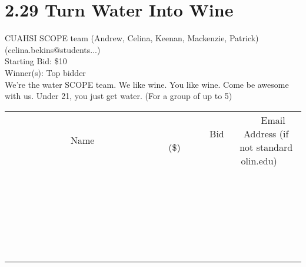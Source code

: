 \documentclass[11pt]{article}
\begin{document}
\section*{2.29 Turn Water Into Wine}
CUAHSI SCOPE team (Andrew, Celina, Keenan, Mackenzie, Patrick) (celina.bekins@students...) \\
Starting Bid: \$10 \\
Winner(s): 
Top bidder \\
We're the water SCOPE team. We like wine. You like wine. Come be awesome with us. Under 21, you just get water. (For a group of up to 5) \\[6ex]
\begin{tabular}{c c c}
~~~~~~~~~~~~~Name~~~~~~~~~~~~~ & ~~~~~~~~~Bid (\$)~~~~~~~~~ & ~~~Email Address (if not standard olin.edu)~~~ \\
 & & \\
\hline
 & & \\
\hline
 & & \\
\hline
 & & \\
\hline
 & & \\
\hline
 & & \\
\hline
 & & \\
\hline
 & & \\
\hline
 & & \\
\hline
 & & \\
\hline
 & & \\
\hline
 & & \\
\hline
 & & \\
\hline
 & & \\
\hline
 & & \\
\hline
 & & \\
\hline
 & & \\
\hline
 & & \\
\hline
 & & \\
\hline
 & & \\
\hline
 & & \\
\hline
 & & \\
\hline
 & & \\
\hline
 & & \\
\hline
 & & \\
\hline
 & & \\
\hline
\end{tabular}
\clearpage
\end{document}

